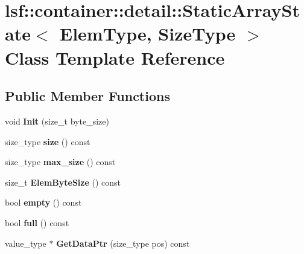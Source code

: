 \hypertarget{classlsf_1_1container_1_1detail_1_1StaticArrayState}{
\section{lsf::container::detail::StaticArrayState$<$ ElemType, SizeType $>$ Class Template Reference}
\label{classlsf_1_1container_1_1detail_1_1StaticArrayState}
}
\subsection*{Public Member Functions}
\begin{DoxyCompactItemize}
\item 
\hypertarget{classlsf_1_1container_1_1detail_1_1StaticArrayState_a7ebfcac289127df331d7b61654a2b6e4}{
void {\bfseries Init} (size\_\-t byte\_\-size)}
\label{classlsf_1_1container_1_1detail_1_1StaticArrayState_a7ebfcac289127df331d7b61654a2b6e4}

\item 
\hypertarget{classlsf_1_1container_1_1detail_1_1StaticArrayState_a0721859984c9f38ff72a942cd346bb6a}{
size\_\-type {\bfseries size} () const }
\label{classlsf_1_1container_1_1detail_1_1StaticArrayState_a0721859984c9f38ff72a942cd346bb6a}

\item 
\hypertarget{classlsf_1_1container_1_1detail_1_1StaticArrayState_acaa9e115db92c2744852a8bb04641bb7}{
size\_\-type {\bfseries max\_\-size} () const }
\label{classlsf_1_1container_1_1detail_1_1StaticArrayState_acaa9e115db92c2744852a8bb04641bb7}

\item 
\hypertarget{classlsf_1_1container_1_1detail_1_1StaticArrayState_a3c9411b268c1f2b20d44b2cdeefa4c26}{
size\_\-t {\bfseries ElemByteSize} () const }
\label{classlsf_1_1container_1_1detail_1_1StaticArrayState_a3c9411b268c1f2b20d44b2cdeefa4c26}

\item 
\hypertarget{classlsf_1_1container_1_1detail_1_1StaticArrayState_a4bf1ebc9740670c72e8f2093b0d1a8c7}{
bool {\bfseries empty} () const }
\label{classlsf_1_1container_1_1detail_1_1StaticArrayState_a4bf1ebc9740670c72e8f2093b0d1a8c7}

\item 
\hypertarget{classlsf_1_1container_1_1detail_1_1StaticArrayState_aa3b27946e7fcac3113689d96b32fd578}{
bool {\bfseries full} () const }
\label{classlsf_1_1container_1_1detail_1_1StaticArrayState_aa3b27946e7fcac3113689d96b32fd578}

\item 
\hypertarget{classlsf_1_1container_1_1detail_1_1StaticArrayState_a0a7c654f1dee8298a31bf49497e8eb83}{
value\_\-type $\ast$ {\bfseries GetDataPtr} (size\_\-type pos) const }
\label{classlsf_1_1container_1_1detail_1_1StaticArrayState_a0a7c654f1dee8298a31bf49497e8eb83}

\end{DoxyCompactItemize}
